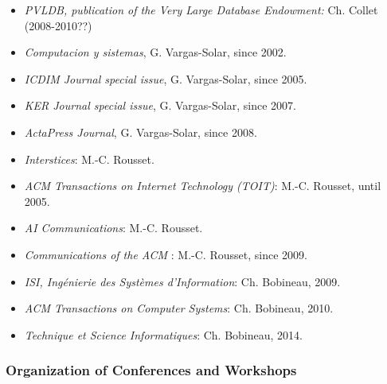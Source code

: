 \begin{itemize}
\setlength{\itemindent}{-0.5cm}
\setlength{\itemsep}{-0.1cm}
\item {\it PVLDB, publication of the Very Large Database Endowment:} Ch. Collet (2008-2010??)

\item {\it Computacion y sistemas}, G. Vargas-Solar, since 2002.

\item {\it ICDIM Journal special issue}, G. Vargas-Solar, since 2005.

\item {\it KER Journal special issue}, G. Vargas-Solar, since 2007.

\item {\it ActaPress Journal}, G. Vargas-Solar, since 2008.

\item {\it Interstices}: M.-C. Rousset.

\item {\it ACM Transactions on Internet Technology (TOIT)}: M.-C. Rousset,  until 2005.

\item {\it AI Communications}: M.-C. Rousset.

\item {\it Communications of the ACM }: M.-C. Rousset,  since 2009.

\item {\it ISI, Ing\'enierie des Syst\`emes d'Information}: Ch. Bobineau, 2009. 

\item {\it ACM Transactions on Computer Systems}: Ch. Bobineau, 2010.

\item {\it Technique et Science Informatiques}: Ch. Bobineau, 2014.


\end{itemize}

\subsubsection*{Organization of Conferences and Workshops}

